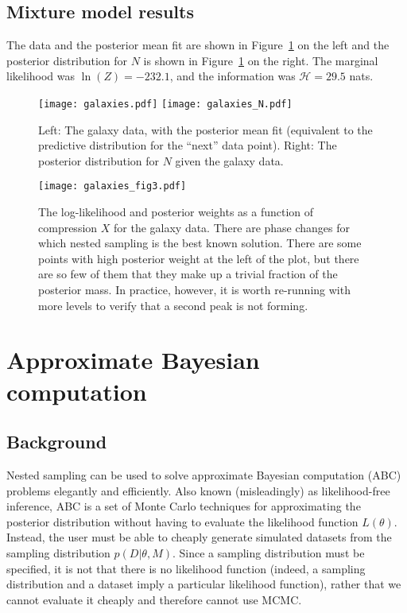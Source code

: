 \documentclass[article]{jss}
\begin{document}
\subsection{Mixture model results}
The data and the posterior mean fit are shown
in Figure~\ref{fig:galaxies} on the left and the posterior distribution for
$N$ is shown in Figure~\ref{fig:galaxies} on the right.
The marginal likelihood was $\ln(Z) = -232.1$, and
the information was $\mathcal{H} = 29.5$ nats.

\begin{figure}[t!]
\centering
\texttt{[image: galaxies.pdf]}%
\texttt{[image: galaxies\_N.pdf]}
\caption{Left: The galaxy data, with the posterior mean fit
  (equivalent to the predictive distribution for the ``next'' data point).
  Right: The posterior distribution for $N$ given the
galaxy data.
\label{fig:galaxies}}
\end{figure}


\begin{figure}[t!]
\centering
\texttt{[image: galaxies\_fig3.pdf]}
\caption{The log-likelihood and posterior weights as a function
of compression $X$ for the galaxy data. There are phase changes
\citep{skilling2006nested} for which nested sampling is the best known
solution. There are some points with high posterior weight at the left
of the plot, but there are so few of them that they make up a trivial
fraction of the posterior mass. In practice, however, it is worth
re-running with more levels to verify that a second peak is not forming.
\label{fig:galaxies_fig3}}
\end{figure}


\section{Approximate Bayesian computation}
\subsection{Background}
Nested sampling can be used to solve approximate Bayesian computation (ABC)
problems elegantly and efficiently.
Also known (misleadingly) as likelihood-free inference,
ABC
is a set of Monte Carlo techniques for approximating the posterior distribution
without having to evaluate the likelihood function $L(\theta)$. Instead, 
the user must be able to cheaply
generate simulated datasets from the sampling distribution $p(D|\theta, M)$.
Since a sampling distribution must be specified, it is not that there is
no likelihood function (indeed, a sampling distribution and
a dataset imply a particular likelihood function), rather that we cannot
evaluate it cheaply and therefore cannot use MCMC.
\end{document}
